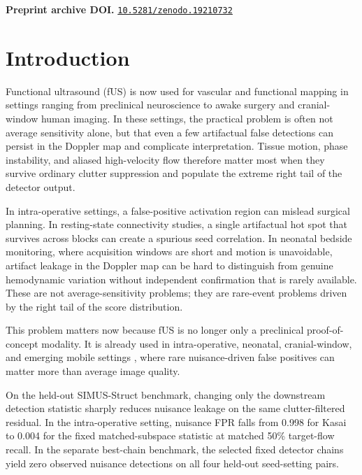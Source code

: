 \documentclass[11pt]{article}
\newif\ifSUPPLEMENTONLY
\begin{document}
\noindent\textbf{Preprint archive DOI.} \href{https://doi.org/10.5281/zenodo.19210732}{\texttt{10.5281/zenodo.19210732}}

\fi

\ifSUPPLEMENTONLY\else
\section{Introduction}

Functional ultrasound (fUS) is now used for vascular and functional mapping in settings ranging from preclinical neuroscience to awake surgery and cranial-window human imaging. In these settings, the practical problem is often not average sensitivity alone, but that even a few artifactual false detections can persist in the Doppler map and complicate interpretation. Tissue motion, phase instability, and aliased high-velocity flow therefore matter most when they survive ordinary clutter suppression and populate the extreme right tail of the detector output.

In intra-operative settings, a false-positive activation region can mislead surgical planning. In resting-state connectivity studies, a single artifactual hot spot that survives across blocks can create a spurious seed correlation. In neonatal bedside monitoring, where acquisition windows are short and motion is unavoidable, artifact leakage in the Doppler map can be hard to distinguish from genuine hemodynamic variation without independent confirmation that is rarely available. These are not average-sensitivity problems; they are rare-event problems driven by the right tail of the score distribution.

This problem matters now because fUS is no longer only a preclinical proof-of-concept modality. It is already used in intra-operative, neonatal, cranial-window, and emerging mobile settings \cite{Imbault2017,DemeneHumanNewborn2017,BarangerNeonates2021,Rabut2024,MobileFUS2025,Deffieux2021}, where rare nuisance-driven false positives can matter more than average image quality.

On the held-out SIMUS-Struct benchmark, changing only the downstream detection statistic sharply reduces nuisance leakage on the same clutter-filtered residual. In the intra-operative setting, nuisance FPR falls from 0.998 for Kasai to 0.004 for the fixed matched-subspace statistic at matched 50\% target-flow recall. In the separate best-chain benchmark, the selected fixed detector chains yield zero observed nuisance detections on all four held-out seed-setting pairs.
\end{document}
